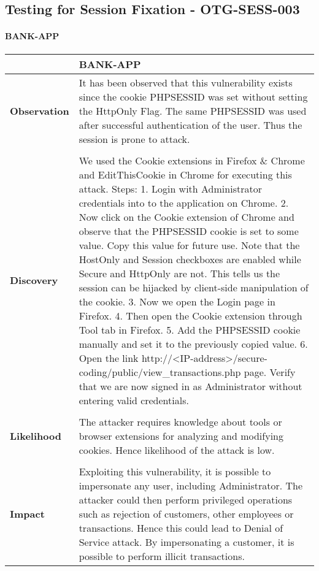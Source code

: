 \subsection{Testing for Session Fixation - OTG-SESS-003} \label{OTG-SESS-003}
\paragraph{BANK-APP} \mbox{}
\begin{longtable*}{p{.20\textwidth} | p{.80\textwidth}}
    \hline
    & \textbf{BANK-APP} \\
    \hline
    \textbf{Observation} &
      It has been observed that this vulnerability exists since the cookie PHPSESSID was set without setting the HttpOnly Flag. The same PHPSESSID was used after successful authentication of the user. Thus the session is prone to attack.
    \\\\
    \textbf{Discovery} &
        We used the Cookie extensions in Firefox \& Chrome and EditThisCookie in Chrome for executing this attack.
        Steps:
        1. Login with Administrator credentials into to the application on Chrome. 2. Now click on the Cookie extension of Chrome and observe that the PHPSESSID cookie  is set to some value. Copy this value for future use. Note that the HostOnly and Session checkboxes are enabled while Secure and HttpOnly are not. This tells us the session can be hijacked by client-side manipulation of the cookie. 3. Now we open the Login page in Firefox. 4. Then open the Cookie extension through Tool tab in Firefox. 5. Add the PHPSESSID cookie manually and set it to the previously copied value. 6. Open the link http://<IP-address>/secure-coding/public/view\_transactions.php page.
        Verify that we are now signed in as Administrator without entering valid credentials.
    \\\\
    \textbf{Likelihood} &
        The attacker requires knowledge about tools or browser extensions for analyzing and modifying cookies. Hence likelihood of the attack is low.
    \\\\
    \textbf{Impact} &
        Exploiting this vulnerability, it is possible to impersonate any user, including Administrator. The attacker could then perform privileged operations such as rejection of customers, other employees or transactions. Hence this could lead to Denial of Service attack. By impersonating a customer, it is possible to perform illicit transactions.

\end{longtable*}
